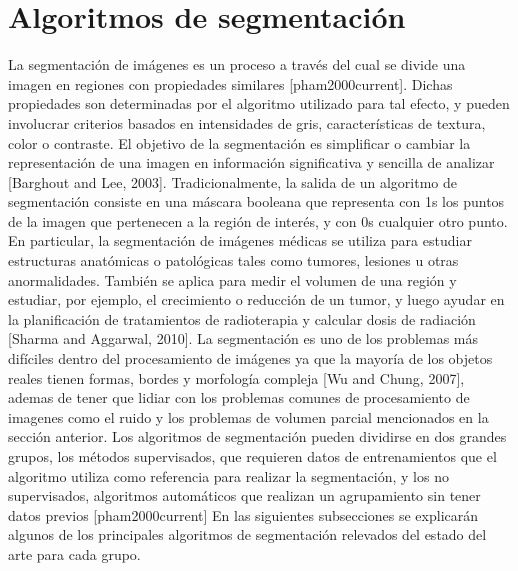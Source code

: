 \section{Algoritmos de segmentación}\label{section:algoritmos}
La segmentación de imágenes es un proceso a través del cual se divide una imagen en regiones con propiedades similares [pham2000current]. Dichas propiedades son determinadas por el algoritmo utilizado para tal efecto, y pueden involucrar criterios basados en intensidades de gris, características de textura, color o contraste. El objetivo de la segmentación es simplificar o cambiar la representación de una imagen en información significativa y sencilla de analizar [Barghout and Lee, 2003]. Tradicionalmente, la salida de un algoritmo de segmentación consiste en una máscara booleana que representa con 1s los puntos de la imagen que pertenecen a la región de interés, y con 0s cualquier otro punto. En particular, la segmentación de imágenes médicas se utiliza para estudiar estructuras anatómicas o patológicas tales como tumores, lesiones u otras anormalidades. También se aplica para medir el volumen de una región y estudiar, por ejemplo, el crecimiento o reducción de un tumor, y luego ayudar en la planificación de tratamientos de radioterapia y calcular dosis de radiación [Sharma and Aggarwal, 2010]. 
La segmentación es uno de los problemas más difíciles dentro del procesamiento de imágenes ya que la mayoría de los objetos reales tienen formas, bordes y morfología compleja [Wu and Chung, 2007], ademas de tener que lidiar con los problemas comunes de procesamiento de imagenes como el ruido y los problemas de volumen parcial mencionados en la sección anterior. 
Los algoritmos de segmentación pueden dividirse en dos grandes grupos, los métodos supervisados, que requieren datos de entrenamientos que el algoritmo utiliza como referencia para realizar la segmentación, y los no supervisados, algoritmos automáticos que realizan un agrupamiento sin tener datos previos [pham2000current]
En las siguientes subsecciones se explicarán algunos de los principales algoritmos de segmentación relevados del estado del arte para cada grupo.

